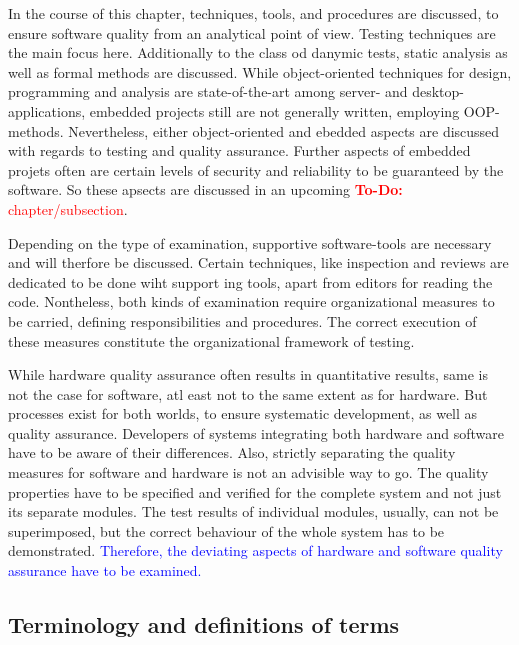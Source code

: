 \documentclass[master,english,smartquotes,apa]{hgbthesis}
\newcommand{\TODO}[1]{\textcolor{red}{\textbf{To-Do:} #1}}
\newcommand{\BLUE}[1]{\textcolor{blue}{#1}}
\begin{document}
In the course of this chapter, techniques, tools, and procedures are discussed, to ensure software quality from an analytical point of view. Testing techniques are the main focus here. Additionally to the class od danymic tests, static analysis as well as formal methods are discussed. While object-oriented techniques for design, programming and analysis are state-of-the-art among server- and desktop-applications, embedded projects still are not generally written, employing OOP-methods. Nevertheless, either object-oriented and ebedded aspects are discussed with regards to testing and quality assurance. Further aspects of embedded projets often are certain levels of security and reliability to be guaranteed by the software. So these apsects are discussed in an upcoming \TODO{chapter/subsection}.

Depending on the type of examination, supportive software-tools are necessary and will therfore be discussed. Certain techniques, like inspection and reviews are dedicated to be done wiht support ing tools, apart from editors for reading the code. Nontheless, both kinds of examination require organizational measures to be carried, defining responsibilities and procedures. The correct execution of these measures constitute the organizational framework of testing.

While hardware quality assurance often results in quantitative results, same is not the case for software, atl east not to the same extent as for hardware. But processes exist for both worlds, to ensure systematic development, as well as quality assurance. Developers of systems integrating both hardware and software have to be aware of their differences. Also, strictly separating the quality measures for software and hardware is not an advisible way to go. The quality properties have to be specified and verified for the complete system and not just its separate modules. The test results of individual modules, usually, can not be superimposed, but the correct behaviour of the whole system has to be demonstrated. \BLUE{Therefore, the deviating aspects of hardware and software quality assurance have to be examined.}
	
	\subsection{Terminology and definitions of terms}
\end{document}
